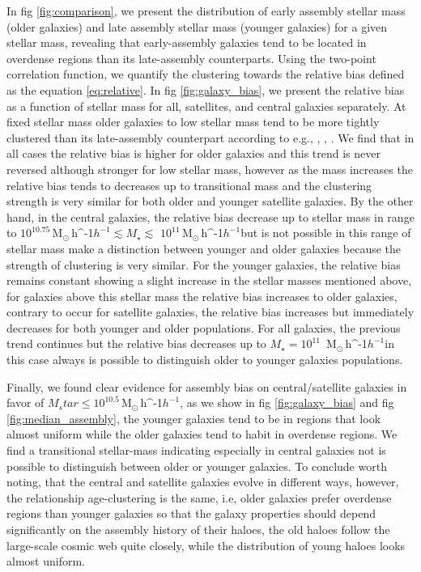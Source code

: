 \documentclass[fleqn,usenatbib]{mnras}
\newcommand{\Msunh}{\,{\rm M}$_{\odot}$\,\ifmmode h^{-1}\else $h^{-1}$\fi}
\begin{document}
In fig \ref{fig:comparison}, we present the distribution of early assembly stellar mass (older galaxies) and late assembly stellar mass (younger galaxies) for a given stellar mass, revealing that early-assembly galaxies tend to be located in overdense regions than its late-assembly counterparts. 
Using the two-point correlation function, we quantify the clustering towards the relative bias defined as the equation \ref{eq:relative}. In fig \ref{fig:galaxy_bias}, we present the relative bias as a function of stellar mass for all, satellites, and central galaxies separately. At fixed stellar mass older galaxies to low stellar mass tend to be more tightly clustered than its late-assembly counterpart according to e.g., \citep{Lacerna_2014}, \citep{2013MNRAS.433..515W}, \citep{2009MNRAS.394.2229Z}. We find that in all cases the relative bias is higher for older galaxies and this trend is never reversed although stronger for low stellar mass, however as the mass increases the relative bias tends to decreases up to transitional mass and the clustering strength is very similar for both older and younger satellite galaxies.
By the other hand, in the central galaxies, the relative bias decrease up to stellar mass in range to $10^{10.75}$\Msunh $\lesssim M_\star \lesssim$ $10^{11}$\Msunh but is not possible in this range of stellar mass make a distinction between younger and older galaxies because the strength of clustering is very similar. 
For the younger galaxies, the relative bias remains constant showing a slight increase in the stellar masses mentioned above, for galaxies above this stellar mass the relative bias increases to older galaxies, contrary to occur for satellite galaxies, the relative bias increases but immediately decreases for both younger and older populations. For all galaxies, the previous trend continues but the relative bias decreases up to $M_\star = 10^{11}$ \Msunh in this case always is possible to distinguish older to younger galaxies populations.

Finally, we found clear evidence for assembly bias on central/satellite galaxies in favor of $M_star \leq 10^{10.5}$\Msunh, as we show in fig \ref{fig:galaxy_bias} and fig \ref{fig:median_assembly}, the younger galaxies tend to be in regions that look almost uniform while the older galaxies tend to habit in overdense regions. We find a transitional stellar-mass indicating especially in central galaxies not is possible to distinguish between older or younger galaxies. 
To conclude worth noting, that the central and satellite galaxies evolve in different ways, however, the relationship age-clustering is the same, i.e, older galaxies prefer overdense regions than younger galaxies so that the galaxy properties should depend significantly on the assembly history of their haloes, the old haloes follow the large-scale cosmic web quite closely, while the distribution of young haloes looks almost uniform.
\end{document}
